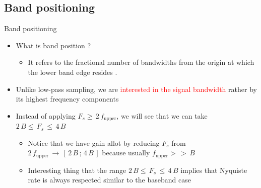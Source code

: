 \documentclass{beamer}
\begin{document}
\subsection{Band positioning}
\begin{frame}[t]{Band positioning}

\begin{itemize}

\item What is band position ?

	\begin{itemize}
	\item It refers to the fractional number of bandwidths from the origin at which the lower band edge resides \cite{paper_bandpass_sampling_theory}.
	\end{itemize}

\item Unlike low-pass sampling, we are \textcolor{red}{interested in the signal bandwidth} rather by its highest frequency components

\item Instead of applying $F_s \geq \, 2 \, f_{\text{upper}}$, we will see that we can take $ 2 \, B \leq \, F_s \, \leq \, 4 \, B$

	\begin{itemize}
	\item Notice that we have gain allot by reducing $F_s$ from $ 2 \, f_{\text{upper}} \, \rightarrow \, [\,2 \, B \, ; \, 4 \, B \, ]$ because usually $f_{\text{upper}} >\, >\, B$
	
	\item Interesting thing that the range $2 \, B \leq \, F_s \, \leq \, 4 \, B$ implies that Nyquiste rate is always respected similar to the baseband case
	\end{itemize}

\end{itemize}

\end{frame}
\end{document}
